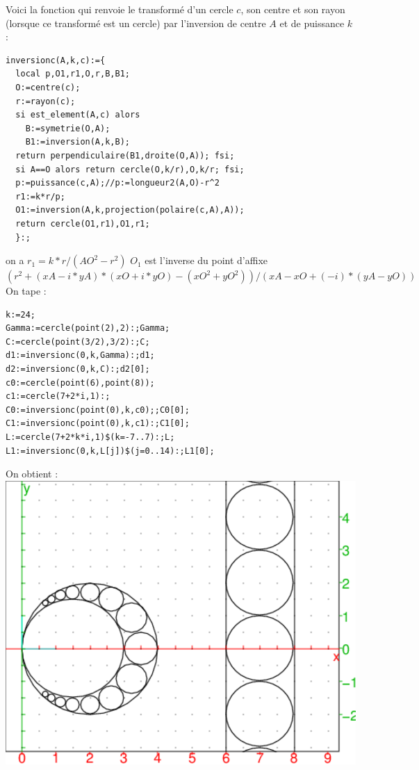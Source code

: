 \documentclass[a4paper,11pt]{book}
\begin{document}
Voici la fonction qui renvoie le transform\'e d'un cercle $c$, son centre et 
son rayon (lorsque ce transform\'e est un cercle) par l'inversion de centre $A$
et de puissance $k$ :
\begin{verbatim}
inversionc(A,k,c):={
  local p,O1,r1,O,r,B,B1;
  O:=centre(c);
  r:=rayon(c);
  si est_element(A,c) alors
    B:=symetrie(O,A);
    B1:=inversion(A,k,B);
  return perpendiculaire(B1,droite(O,A)); fsi;
  si A==O alors return cercle(O,k/r),O,k/r; fsi;
  p:=puissance(c,A);//p:=longueur2(A,O)-r^2
  r1:=k*r/p;
  O1:=inversion(A,k,projection(polaire(c,A),A));
  return cercle(O1,r1),O1,r1;
  }:;
\end{verbatim} 
on a 
$r_1=k*r/(AO^2-r^2)$
$O_1$ est l'inverse du point d'affixe
$(r^2+(xA-i*yA)*(xO+i*yO)-(xO^2+yO^2))/(xA-xO+(-i)*(yA-yO))$
On tape :\\
\begin{verbatim}
k:=24;
Gamma:=cercle(point(2),2):;Gamma;
C:=cercle(point(3/2),3/2):;C;
d1:=inversionc(0,k,Gamma):;d1;
d2:=inversionc(0,k,C):;d2[0];
c0:=cercle(point(6),point(8));
c1:=cercle(7+2*i,1):;
C0:=inversionc(point(0),k,c0);;C0[0];
C1:=inversionc(point(0),k,c1):;C1[0];
L:=cercle(7+2*k*i,1)$(k=-7..7):;L;
L1:=inversionc(0,k,L[j])$(j=0..14):;L1[0];
\end{verbatim} 

On obtient :\\
\includegraphics[width=\textwidth]{pappus2}\\
\end{document}
